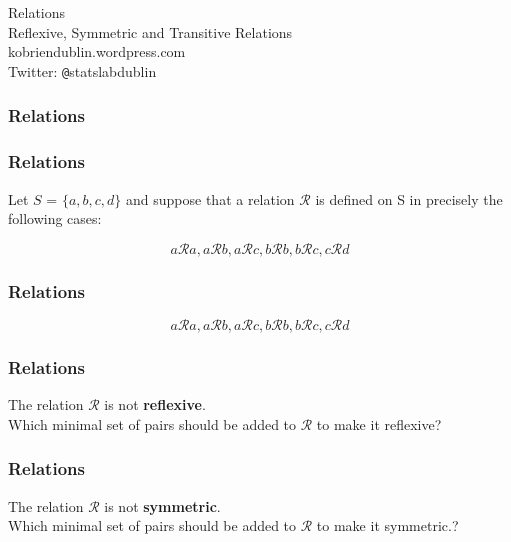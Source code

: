 \documentclass{beamer}
\begin{document}
\begin{frame}
\begin{center}
\Huge
Relations\\
\LARGE
Reflexive, Symmetric and Transitive Relations\\
\bigskip
kobriendublin.wordpress.com\\
Twitter: \texttt{@}statslabdublin


\end{center}
\end{frame}


\begin{frame}
	\frametitle{Relations}
	
\tableofcontents
\end{frame}


\begin{frame}
\frametitle{Relations}
\LARGE
\vspace{-2cm}
Let $S$ = $\{ a,b,c,d \}$ and suppose that a relation $\mathcal{R}$ is defined on S in precisely the following cases:

\[ a\mathcal{R}a , a\mathcal{R}b , a\mathcal{R}c , b\mathcal{R}b, b\mathcal{R}c , c\mathcal{R}d  \]

\end{frame}


\begin{frame}
\frametitle{Relations}

\LARGE
\vspace{-5.5cm}
\[ a\mathcal{R}a , a\mathcal{R}b , a\mathcal{R}c , b\mathcal{R}b, b\mathcal{R}c , c\mathcal{R}d  \]

\end{frame}

\begin{frame}
\frametitle{Relations}
\LARGE
\vspace{-2cm}

The relation $\mathcal{R}$ is not \textbf{reflexive}. \\ \bigskip Which minimal set of pairs should be added to  $\mathcal{R}$  to make it reflexive?
\end{frame}
\begin{frame}
\frametitle{Relations}
\LARGE
\vspace{-2cm}

The relation $\mathcal{R}$ is not \textbf{symmetric}. \\\bigskip Which minimal set of pairs should be added to  $\mathcal{R}$  to make it symmetric.?
\end{frame}
\end{document}
